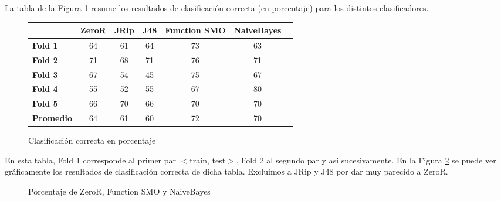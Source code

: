 La tabla de la Figura \ref{class_corr_en_pct} resume los resultados de clasificación correcta (en porcentaje) para los distintos clasificadores.

\begin{figure}[H]
\begin{table}[H]
\centering
\begin{tabular}{|l|c|c|c|c|c|c|}
\hline
\textbf{}  & \textbf{ZeroR} & \textbf{JRip} & \textbf{J48} & \textbf{Function SMO} & \textbf{NaiveBayes} \\ \hline
\textbf{Fold 1}  & 64 & 61 & 64 & 73 & 63 \\ \hline
\textbf{Fold 2}  & 71 & 68 & 71 & 76 & 71 \\ \hline
\textbf{Fold 3}  & 67 & 54 & 45 & 75 & 67 \\ \hline
\textbf{Fold 4}  & 55 & 52 & 55 & 67 & 80 \\ \hline
\textbf{Fold 5}  & 66 & 70 & 66 & 70 & 70 \\ \hline
\hline \hline
\textbf{Promedio} & 64 & 61 & 60 & 72 & 70 \\ \hline
\end{tabular}
\end{table}
\caption{Clasificación correcta en porcentaje}
\label{class_corr_en_pct}
\end{figure}

En esta tabla, Fold 1 corresponde al primer par $<$train, test$>$, Fold 2 al segundo par y así sucesivamente. En la Figura \ref{porcentajexClasificador} se puede ver gráficamente los resultados de clasificación correcta de dicha tabla. Excluimos a JRip y J48 por dar muy parecido a ZeroR.

\begin{figure}[H]
\centering
{}
\caption{Porcentaje de ZeroR, Function SMO y NaiveBayes}
\label{porcentajexClasificador}
\end{figure}


